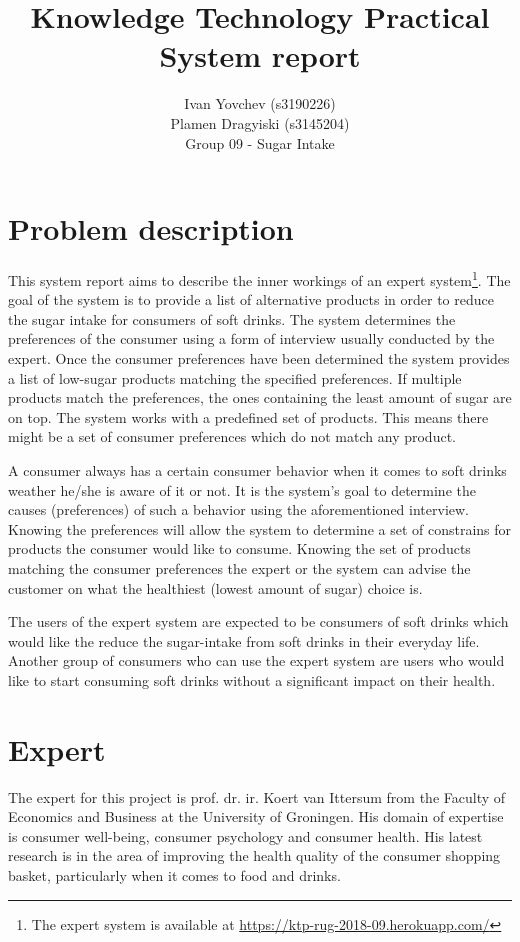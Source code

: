 \documentclass[11pt,a4paper]{article}
\title{Knowledge Technology Practical\\ System report}
\author{Ivan Yovchev (s3190226) \\
		Plamen Dragyiski (s3145204)\\
		Group 09 - Sugar Intake}
\begin{document}
\maketitle

\section{Problem description}

This system report aims to describe the inner workings of an expert system\footnote{The expert system is available at \url{https://ktp-rug-2018-09.herokuapp.com/}}. The goal of the system is to provide a list of alternative products in order to reduce the sugar intake for consumers of soft drinks. The system determines the preferences of the consumer using a form of interview usually conducted by the expert. Once the consumer preferences have been determined the system provides a list of low-sugar products matching the specified preferences. If multiple products match the preferences, the ones containing the least amount of sugar are on top. The system works with a predefined set of products. This means there might be a set of consumer preferences which do not match any product.

A consumer always has a certain consumer behavior when it comes to soft drinks weather he/she is aware of it or not. It is the system's goal to determine the causes (preferences) of such a behavior using the aforementioned interview. Knowing the preferences will allow the system to determine a set of constrains for products the consumer would like to consume. Knowing the set of products matching the consumer preferences the expert or the system can advise the customer on what the healthiest (lowest amount of sugar) choice is.

The users of the expert system are expected to be consumers of soft drinks which would like the reduce the sugar-intake from soft drinks in their everyday life. Another group of consumers who can use the expert system are users who would like to start consuming soft drinks without a significant impact on their health.

\section{Expert}

The expert for this project is prof. dr. ir. Koert van Ittersum from the Faculty of Economics and Business at the University of Groningen. His domain of expertise is consumer well-being, consumer psychology and consumer health. His latest research is in the area of improving the health quality of the consumer shopping basket, particularly when it comes to food and drinks.
\end{document}
